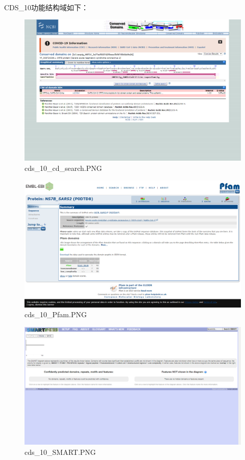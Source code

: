\documentclass[supercite]{HustGraduPaper}
\begin{document}
	\paragraph{}\label{subpara:subpara}CDS\_10功能结构域如下：
	\begin{figure}[H]
		\centering
		\includegraphics[width=1\textwidth]{./material/practice2/cds_10/cd_search.png}
		\caption{cds\_10\_cd\_search.PNG}
	\end{figure}
	\begin{figure}[H]
		\centering
		\includegraphics[width=1\textwidth]{./material/practice2/cds_10/Pfam.png}
		\caption{cds\_10\_Pfam.PNG}
	\end{figure}
	\begin{figure}[H]
		\centering
		\includegraphics[width=1\textwidth]{./material/practice2/cds_10/SMART.png}
		\caption{cds\_10\_SMART.PNG}
	\end{figure}
\end{document}
